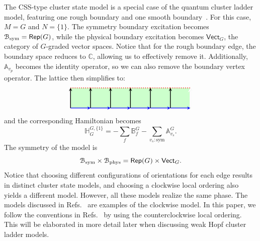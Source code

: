 \documentclass[a4paper,11pt]{article}
\theoremstyle{theorem}
\theoremstyle{remark}
\newcommand\eB           {\EuScript{B}}
\newcommand{\Av}{\mathbb{A}}
\newcommand{\Bf}{\mathbb{B}}
\newcommand{\Cbb}{\mathbb{C}}
\newcommand{\Hbb}{\mathbb{H}}
\newcommand{\Rep}{\mathsf{Rep}}
\newcommand{\Vect}{\mathsf{Vect}}
\begin{document}
The CSS-type cluster state model is a special case of the quantum cluster ladder model, featuring one rough boundary and one smooth boundary~\cite{jia2024generalized}. 
For this case, \( M = G \) and \( N = \{1\} \). The symmetry boundary excitation becomes \(\eB_{\rm sym} = \Rep(G)\), while the physical boundary excitation becomes \(\Vect_G\), the category of $G$-graded vector spaces. 
Notice that for the rough boundary edge, the boundary space reduces to \(\Cbb\), allowing us to effectively remove it. Additionally, \(\Av_{v_p}\) becomes the identity operator, so we can also remove the boundary vertex operator. The lattice then simplifies to:
\begin{equation}\label{eq:ClusterLatticeG}
\begin{aligned}
\begin{tikzpicture}
    \def\n{5}
    \def\s{1}
    \fill[green!20] (0, 0) rectangle (\n*\s+\s, \s); %
    \foreach \i in {0,...,\n} {
        \draw[-stealth, line width=1.0pt,blue, midway] (\i*\s, 0) -- (\i*\s+\s, 0);
        \draw[dotted, line width=1.0pt,red, midway] (\i*\s, \s) -- (\i*\s+\s, \s);
        \draw[-stealth,line width=1.0pt, midway] (\i*\s, 0) -- (\i*\s, \s);
    }
    \draw[-stealth, midway,line width=1.0pt] (\n*\s+\s, 0) -- (\n*\s+\s, \s);
          \draw[-stealth, white, line width=2pt, midway] (6, 0) -- (6, 1.02);
\end{tikzpicture}
\end{aligned}
\end{equation}
and the corresponding Hamiltonian becomes 
\begin{equation}
    \Hbb_{G}^{G,\{1\}}= -\sum_f \Bf_f^G-\sum_{v_s: \text{sym}} \Av^{G}_{v_s}.
\end{equation}
The symmetry of the model is 
\begin{equation}
     \eB_{\rm sym} \times \eB_{\rm phys} = \Rep(G)\times \Vect_G.
\end{equation}
Notice that choosing different configurations of orientations for each edge results in distinct cluster state models, and choosing a clockwise local ordering also yields a different model. However, all these models realize the same phase. The models discussed in Refs.~\cite{fechisin2023noninvertible,jia2024generalized} are examples of the clockwise model. In this paper, we follow the conventions in Refs.~\cite{Kitaev2003,jia2023boundary,Jia2023weak} by using the counterclockwise local ordering. This will be elaborated in more detail later when discussing weak Hopf cluster ladder models.
\end{document}
